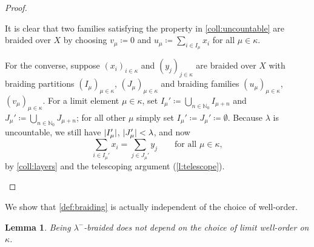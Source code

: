 \documentclass[a4paper,11pt,oneside]{amsart}
\newtheorem{lemma}[teor]{Lemma}
\theoremstyle{remark}
\DeclarePairedDelimiter{\card}{\lvert}{\rvert}
\newcommand{\bN}{\mathbb N}
\begin{document}
\begin{proof}
\begin{proofenumerate}
  \item[\ref{coll:uncountable}]
  It is clear that two families satisfying the property in \ref{coll:uncountable} are braided over $X$ by choosing $v_\mu\coloneqq 0$  and $u_\mu \coloneqq \sum_{i \in I_\mu} x_i$ for all $\mu \in \kappa$.

  For the converse, suppose $(x_i)_{i \in \kappa}$ and $(y_j)_{j \in \kappa}$ are braided over $X$ with braiding partitions $(I_\mu)_{\mu \in \kappa}$, $(J_\mu)_{\mu \in \kappa}$ and braiding families $(u_\mu)_{\mu \in \kappa}$, $(v_\mu)_{\mu \in \kappa}$.
  For a limit element $\mu \in \kappa$, set $I_\mu' \coloneqq \bigcup_{n \in \bN_0} I_{\mu+n}$ and $J_\mu' \coloneqq \bigcup_{n \in \bN_0} J_{\mu+n}$; for all other $\mu$ simply set $I_\mu'\coloneqq J_\mu'\coloneqq \emptyset$.
  Because $\lambda$ is uncountable, we still have $\card{I_\mu'}$, $\card{J_\mu'} < \lambda$, and now
  \[
    \sum_{i \in I_\mu'} x_i = \sum_{j \in J_\mu'} y_j \qquad\text{for all $\mu \in \kappa$},
  \]
  by \ref{coll:layers} and the telescoping argument (\cref{l:telescope}). \qedhere
  \end{proofenumerate}
\end{proof}

We show that \cref{def:braiding} is actually independent of the choice of well-order.

\begin{lemma} \label{l:braided-no-order}
  Being $\lambda^-$-braided does not depend on the choice of limit well-order on $\kappa$.
\end{lemma}
\end{document}
